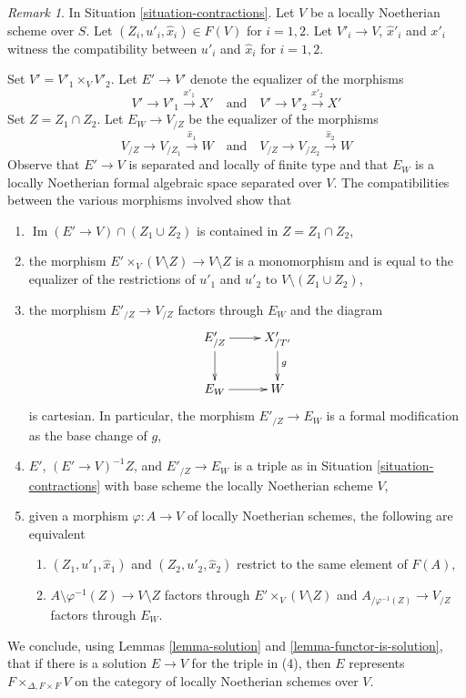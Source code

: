 \documentclass{stacks-project}
\theoremstyle{plain}
\theoremstyle{definition}
\theoremstyle{remark}
\newtheorem{remark}[subsection]{Remark}
\numberwithin{equation}{subsection}
\def\Im{\mathop{\mathrm{Im}}}
\begin{document}
\begin{remark}
\label{remark-diagonal}
In Situation \ref{situation-contractions}.
Let $V$ be a locally Noetherian scheme over $S$.
Let $(Z_i, u'_i, \hat x_i) \in F(V)$ for $i = 1, 2$. Let $V'_i \to V$,
$\hat x'_i$ and $x'_i$ witness the compatibility between $u'_i$ and
$\hat x_i$ for $i = 1, 2$.

\medskip\noindent
Set $V' = V'_1 \times_V V'_2$. Let $E' \to V'$ denote the equalizer
of the morphisms
$$
V' \to V'_1 \xrightarrow{x'_1} X'
\quad\text{and}\quad
V' \to V'_2 \xrightarrow{x'_2} X'
$$
Set $Z = Z_1 \cap Z_2$. Let $E_W \to V_{/Z}$
be the equalizer of the morphisms
$$
V_{/Z} \to V_{/Z_1} \xrightarrow{\hat x_1} W
\quad\text{and}\quad
V_{/Z} \to V_{/Z_2} \xrightarrow{\hat x_2} W
$$
Observe that $E' \to V$ is separated and locally of finite type
and that $E_W$ is a locally Noetherian formal algebraic space
separated over $V$.
The compatibilities between the various morphisms involved show that
\begin{enumerate}
\item $\Im(E' \to V) \cap (Z_1 \cup Z_2)$
is contained in $Z = Z_1 \cap Z_2$, 
\item the morphism $E' \times_V (V \setminus Z) \to V \setminus Z$
is a monomorphism and is equal to the equalizer of the restrictions
of $u'_1$ and $u'_2$ to $V \setminus (Z_1 \cup Z_2)$,
\item the morphism $E'_{/Z} \to V_{/Z}$ factors through $E_W$
and the diagram
$$
\xymatrix{
E'_{/Z} \ar[r] \ar[d] & X'_{/T'} \ar[d]^g \\
E_W \ar[r] & W
}
$$
is cartesian. In particular, the morphism $E'_{/Z} \to E_W$
is a formal modification as the base change of $g$,
\item $E'$, $(E' \to V)^{-1}Z$, and $E'_{/Z} \to E_W$
is a triple as in Situation \ref{situation-contractions}
with base scheme the locally Noetherian scheme $V$,
\item given a morphism $\varphi : A \to V$
of locally Noetherian schemes, the following are equivalent
\begin{enumerate}
\item $(Z_1, u'_1, \hat x_1)$ and $(Z_2, u'_2, \hat x_2)$
restrict to the same element of $F(A)$,
\item $A \setminus \varphi^{-1}(Z) \to V \setminus Z$
factors through $E' \times_V (V \setminus Z)$
and $A_{/\varphi^{-1}(Z)} \to V_{/Z}$
factors through $E_W$.
\end{enumerate}
\end{enumerate}
We conclude, using
Lemmas \ref{lemma-solution} and \ref{lemma-functor-is-solution},
that if there is a solution $E \to V$
for the triple in (4), then $E$ represents
$F \times_{\Delta, F \times F} V$ on the category of
locally Noetherian schemes over $V$.
\end{remark}
\end{document}
